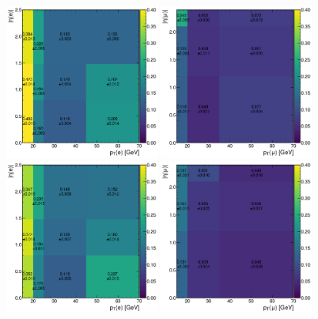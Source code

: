 \begin{figure}
  \centering
  \includegraphics[width=0.45\textwidth]{measurement/2017/fr_data_ewk_Electron.png} \hfill
  \includegraphics[width=0.45\textwidth]{measurement/2017/fr_data_ewk_Muon.png} \\
  \includegraphics[width=0.45\textwidth]{measurement/2017/fr_qcd_Electron.png} \hfill
  \includegraphics[width=0.45\textwidth]{measurement/2017/fr_qcd_Muon.png} \\

\end{figure}
